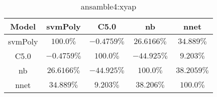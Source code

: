 \begin{table}[!ht]
	\centering
	\begin{tabular}{|c|c|c|c|c|}
		\hline
		Model & svmPoly & C5.0 & nb & nnet \\ \hline
		svmPoly & $100.0\%$ & $-0.4759\%$ & $26.6166\%$ & $34.889\%$ \\ \hline
		C5.0 & $-0.4759\%$ & $100.0\%$ & $-44.925\%$ & $9.203\%$ \\ \hline
		nb & $26.6166\%$ & $-44.925\%$ & $100.0\%$ & $38.2059\%$ \\ \hline
		nnet & $34.889\%$ & $9.203\%$ & $38.206\%$ & $100.0\%$ \\ \hline
	\end{tabular}
	\caption{ansamble4:xyap}
	\label{tab:ansamble4:xyap}
\end{table}
